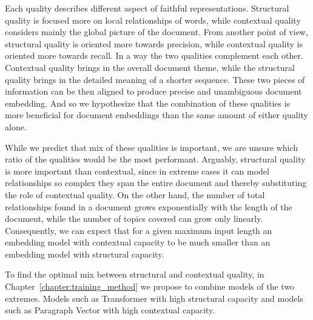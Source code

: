 

Each quality describes different aspect of faithful representations. Structural
quality is focused more on local relationships of words, while contextual
quality considers mainly the global picture of the document. From another point
of view, structural quality is oriented more towards precision, while
contextual quality is oriented more towards recall. In a way the two qualities
complement each other. Contextual quality brings in the overall document theme,
while the structural quality brings in the detailed meaning of a shorter
sequence. These two pieces of information can be then aligned to produce
precise and unambiguous document embedding. And so we hypothesize that the
combination of these qualities is more beneficial for document embeddings than
the same amount of either quality alone.

While we predict that mix of these qualities is important, we are unsure which
ratio of the qualities would be the most performant. Arguably, structural
quality is more important than contextual, since in extreme cases it can model
relationships so complex they span the entire document and thereby substituting
the role of contextual quality. On the other hand, the number of total
relationships found in a document grows exponentially with the length of the
document, while the number of topics covered can grow only linearly.
Consequently, we can expect that for a given maximum input length an embedding
model with contextual capacity to be much smaller than an embedding model with
structural capacity.

To find the optimal mix between structural and contextual quality, in
Chapter~\ref{chapter:training_method} we propose to combine models of the two
extremes. Models such as Transformer with high structural capacity and models
such as Paragraph Vector with high contextual capacity.
